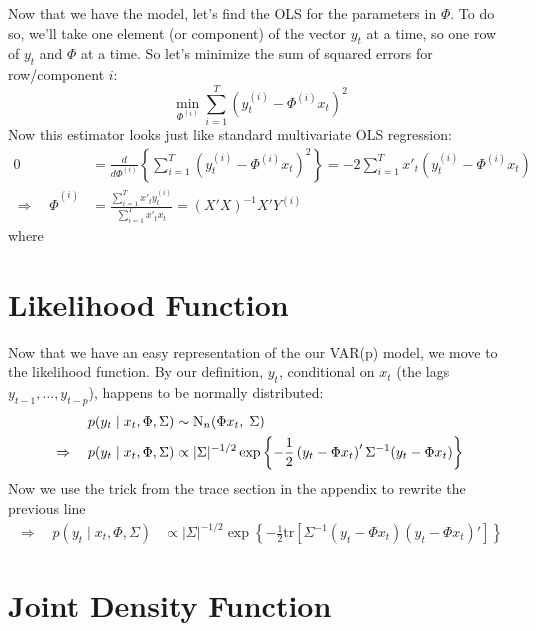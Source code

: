 \documentclass[a4paper,12pt]{scrartcl}
\begin{document}
Now that we have the model, let's find the OLS for 
the parameters in $\Phi$. To do so, we'll take one element (or
component) of the vector $y_t$ at a time, so one row of $y_t$
and $\Phi$ at a time. So let's minimize the sum of
squared errors for row/component $i$: 
\begin{equation}
    \min_{\Phi^{(i)}} \sum^T_{i=1} 
	\left(y_t^{(i)} - \Phi^{(i)} x_t\right)^2
\end{equation}
Now this estimator looks just like standard multivariate OLS 
regression:
\begin{align*}
    0 &= \frac{d}{d\Phi^{(i)}}\left\{ \sum^T_{i=1} 
	\left(y_t^{(i)} - \Phi^{(i)} x_t\right)^2\right\} 
	= -2 \sum^T_{i=1} x'_t
	\left(y_t^{(i)} - \Phi^{(i)} x_t\right) \\
    \Rightarrow \quad \hat{\Phi}^{(i)}  &= 
	\frac{\sum^T_{i=1} x'_t y_t^{(i)} }{\sum^T_{i=1} x'_t x_t}
	= (X' X)^{-1} X' Y^{(i)}
\end{align*}
where 






\newpage
\section{Likelihood Function}

Now that we have an easy representation of the our
VAR(p) model, we move to the likelihood function.
By our definition,  $y_t$, conditional on $x_t$ 
(the lags $y_{t-1}, \ldots, y_{t-p}$), happens
to be normally distributed:
\begin{align}
    p(y_t \; | \; x_t, \Phi, \Sigma) &\sim
	\text{N}_{n}(\Phi x_t, \; \Sigma) \notag \\
    \Rightarrow \quad p(y_t \; | \; x_t, \Phi, \Sigma) 
	&\propto |\Sigma|^{-1/2} 
	\exp\left\{ -\frac{1}{2} \left(y_t - \Phi x_t
	\right)' \Sigma^{-1} (y_t - \Phi x_t)\right\}
\end{align}
Now we use the trick from the trace section in the 
appendix to rewrite the previous line
\begin{align}
    \Rightarrow \quad p(y_t \; | \; x_t, \Phi, \Sigma) 
	&\propto |\Sigma|^{-1/2} 
	\exp\left\{ -\frac{1}{2} \text{tr} \left[ \Sigma^{-1}  
	(y_t - \Phi x_t)\left(y_t - \Phi x_t\right)'
	\right]\right\}
\end{align}





\newpage
\section{Joint Density Function}
\end{document}
